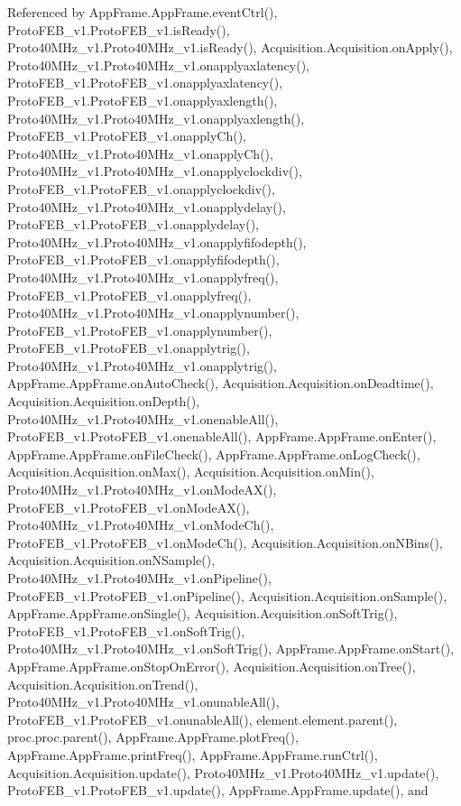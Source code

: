 Referenced by App\+Frame.\+App\+Frame.\+event\+Ctrl(), Proto\+F\+E\+B\+\_\+v1.\+Proto\+F\+E\+B\+\_\+v1.\+is\+Ready(), Proto40\+M\+Hz\+\_\+v1.\+Proto40\+M\+Hz\+\_\+v1.\+is\+Ready(), Acquisition.\+Acquisition.\+on\+Apply(), Proto40\+M\+Hz\+\_\+v1.\+Proto40\+M\+Hz\+\_\+v1.\+onapplyaxlatency(), Proto\+F\+E\+B\+\_\+v1.\+Proto\+F\+E\+B\+\_\+v1.\+onapplyaxlatency(), Proto\+F\+E\+B\+\_\+v1.\+Proto\+F\+E\+B\+\_\+v1.\+onapplyaxlength(), Proto40\+M\+Hz\+\_\+v1.\+Proto40\+M\+Hz\+\_\+v1.\+onapplyaxlength(), Proto\+F\+E\+B\+\_\+v1.\+Proto\+F\+E\+B\+\_\+v1.\+onapply\+Ch(), Proto40\+M\+Hz\+\_\+v1.\+Proto40\+M\+Hz\+\_\+v1.\+onapply\+Ch(), Proto40\+M\+Hz\+\_\+v1.\+Proto40\+M\+Hz\+\_\+v1.\+onapplyclockdiv(), Proto\+F\+E\+B\+\_\+v1.\+Proto\+F\+E\+B\+\_\+v1.\+onapplyclockdiv(), Proto40\+M\+Hz\+\_\+v1.\+Proto40\+M\+Hz\+\_\+v1.\+onapplydelay(), Proto\+F\+E\+B\+\_\+v1.\+Proto\+F\+E\+B\+\_\+v1.\+onapplydelay(), Proto40\+M\+Hz\+\_\+v1.\+Proto40\+M\+Hz\+\_\+v1.\+onapplyfifodepth(), Proto\+F\+E\+B\+\_\+v1.\+Proto\+F\+E\+B\+\_\+v1.\+onapplyfifodepth(), Proto40\+M\+Hz\+\_\+v1.\+Proto40\+M\+Hz\+\_\+v1.\+onapplyfreq(), Proto\+F\+E\+B\+\_\+v1.\+Proto\+F\+E\+B\+\_\+v1.\+onapplyfreq(), Proto40\+M\+Hz\+\_\+v1.\+Proto40\+M\+Hz\+\_\+v1.\+onapplynumber(), Proto\+F\+E\+B\+\_\+v1.\+Proto\+F\+E\+B\+\_\+v1.\+onapplynumber(), Proto\+F\+E\+B\+\_\+v1.\+Proto\+F\+E\+B\+\_\+v1.\+onapplytrig(), Proto40\+M\+Hz\+\_\+v1.\+Proto40\+M\+Hz\+\_\+v1.\+onapplytrig(), App\+Frame.\+App\+Frame.\+on\+Auto\+Check(), Acquisition.\+Acquisition.\+on\+Deadtime(), Acquisition.\+Acquisition.\+on\+Depth(), Proto40\+M\+Hz\+\_\+v1.\+Proto40\+M\+Hz\+\_\+v1.\+onenable\+All(), Proto\+F\+E\+B\+\_\+v1.\+Proto\+F\+E\+B\+\_\+v1.\+onenable\+All(), App\+Frame.\+App\+Frame.\+on\+Enter(), App\+Frame.\+App\+Frame.\+on\+File\+Check(), App\+Frame.\+App\+Frame.\+on\+Log\+Check(), Acquisition.\+Acquisition.\+on\+Max(), Acquisition.\+Acquisition.\+on\+Min(), Proto40\+M\+Hz\+\_\+v1.\+Proto40\+M\+Hz\+\_\+v1.\+on\+Mode\+A\+X(), Proto\+F\+E\+B\+\_\+v1.\+Proto\+F\+E\+B\+\_\+v1.\+on\+Mode\+A\+X(), Proto40\+M\+Hz\+\_\+v1.\+Proto40\+M\+Hz\+\_\+v1.\+on\+Mode\+Ch(), Proto\+F\+E\+B\+\_\+v1.\+Proto\+F\+E\+B\+\_\+v1.\+on\+Mode\+Ch(), Acquisition.\+Acquisition.\+on\+N\+Bins(), Acquisition.\+Acquisition.\+on\+N\+Sample(), Proto40\+M\+Hz\+\_\+v1.\+Proto40\+M\+Hz\+\_\+v1.\+on\+Pipeline(), Proto\+F\+E\+B\+\_\+v1.\+Proto\+F\+E\+B\+\_\+v1.\+on\+Pipeline(), Acquisition.\+Acquisition.\+on\+Sample(), App\+Frame.\+App\+Frame.\+on\+Single(), Acquisition.\+Acquisition.\+on\+Soft\+Trig(), Proto\+F\+E\+B\+\_\+v1.\+Proto\+F\+E\+B\+\_\+v1.\+on\+Soft\+Trig(), Proto40\+M\+Hz\+\_\+v1.\+Proto40\+M\+Hz\+\_\+v1.\+on\+Soft\+Trig(), App\+Frame.\+App\+Frame.\+on\+Start(), App\+Frame.\+App\+Frame.\+on\+Stop\+On\+Error(), Acquisition.\+Acquisition.\+on\+Tree(), Acquisition.\+Acquisition.\+on\+Trend(), Proto40\+M\+Hz\+\_\+v1.\+Proto40\+M\+Hz\+\_\+v1.\+onunable\+All(), Proto\+F\+E\+B\+\_\+v1.\+Proto\+F\+E\+B\+\_\+v1.\+onunable\+All(), element.\+element.\+parent(), proc.\+proc.\+parent(), App\+Frame.\+App\+Frame.\+plot\+Freq(), App\+Frame.\+App\+Frame.\+print\+Freq(), App\+Frame.\+App\+Frame.\+run\+Ctrl(), Acquisition.\+Acquisition.\+update(), Proto40\+M\+Hz\+\_\+v1.\+Proto40\+M\+Hz\+\_\+v1.\+update(), Proto\+F\+E\+B\+\_\+v1.\+Proto\+F\+E\+B\+\_\+v1.\+update(), App\+Frame.\+App\+Frame.\+update(), and 